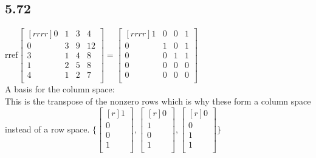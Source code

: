 \documentclass{report}
\begin{document}
\subsection{5.72}
$\mathrm{rref}\begin{bmatrix}[rrrr]0&1&3&4\\0&3&9&12\\3&1&4&8\\1&2&5&8\\4&1&2&7\\\end{bmatrix} = \begin{bmatrix}[rrrr]1&0&0&1\\0&1&0&1\\0&0&1&1\\0&0&0&0\\0&0&0&0\\\end{bmatrix}$\\
A basis for the column space:\\
This is the transpose of the nonzero rows which is why these form a column space instead of a row space.
$\{\begin{bmatrix}[r]1\\0\\0\\1\\\end{bmatrix},\begin{bmatrix}[r]0\\1\\0\\1\\\end{bmatrix},\begin{bmatrix}[r]0\\0\\1\\1\\\end{bmatrix}\}$
\end{document}
